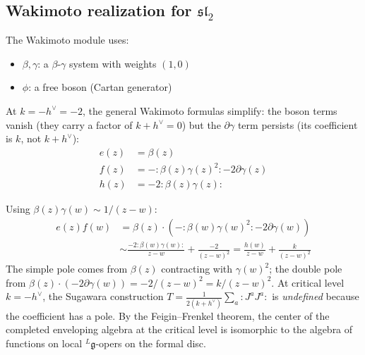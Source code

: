 \subsection{\texorpdfstring{Wakimoto realization for $\mathfrak{sl}_2$}{Wakimoto realization for sl-2}}

\begin{construction}[Wakimoto for $\mathfrak{sl}_2$ at $k=-2$]
The Wakimoto module uses:
\begin{itemize}
\item $\beta, \gamma$: a $\beta$-$\gamma$ system with weights $(1,0)$
\item $\phi$: a free boson (Cartan generator)
\end{itemize}

At $k = -h^\vee = -2$, the general Wakimoto formulas simplify:
the boson terms vanish (they carry a factor of $k + h^\vee = 0$) but the $\partial\gamma$ term
persists (its coefficient is $k$, not $k + h^\vee$):
\begin{align}
e(z) &= \beta(z) \\
f(z) &= -{:}\beta(z)\gamma(z)^2{:} - 2\partial\gamma(z) \\
h(z) &= -2{:}\beta(z)\gamma(z){:}
\end{align}
\end{construction}

\begin{computation}
Using $\beta(z)\gamma(w) \sim 1/(z-w)$:
\begin{align}
e(z)f(w) &= \beta(z) \cdot (-{:}\beta(w)\gamma(w)^2{:} - 2\partial\gamma(w)) \\
&\sim \frac{-2{:}\beta(w)\gamma(w){:}}{z-w} + \frac{-2}{(z-w)^2}
= \frac{h(w)}{z-w} + \frac{k}{(z-w)^2}
\end{align}
The simple pole comes from $\beta(z)$ contracting with $\gamma(w)^2$; the double pole from $\beta(z)\cdot(-2\partial\gamma(w)) = -2/(z-w)^2 = k/(z-w)^2$. At critical level $k = -h^\vee$, the Sugawara construction $T = \frac{1}{2(k+h^\vee)}\sum_a {:}J^a J^a{:}$ is \emph{undefined} because the coefficient has a pole.
By the Feigin--Frenkel theorem, the center of the completed enveloping
algebra at the critical level is isomorphic to the algebra of
functions on local ${}^L\mathfrak{g}$-opers on the formal disc.
\end{computation}

